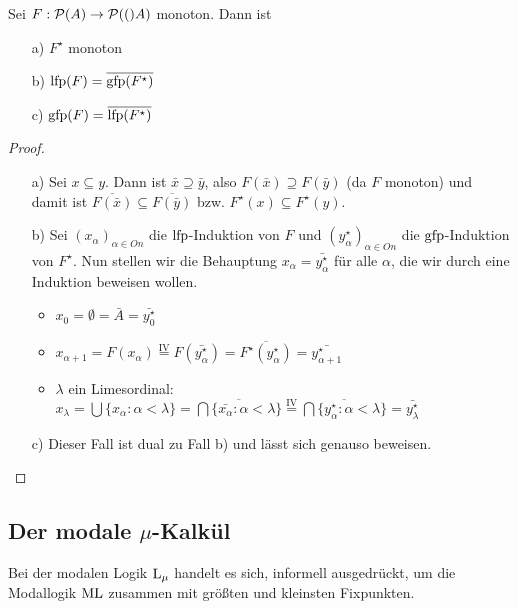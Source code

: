 \begin{satz}
	Sei $F:\mathcal{P}(A)\to\mathcal{P}(()A)$ monoton. Dann ist
	\begin{itemize}
		\item[a)] $F^\star$ monoton
		\item[b)] $\operatorname{lfp}(F)=\overline{\operatorname{gfp}(F^\star)}$
		\item[c)] $\operatorname{gfp}(F)=\overline{\operatorname{lfp}(F^\star)}$
	\end{itemize}
\end{satz}
\begin{proof}
	\begin{itemize}
		\item[a)] Sei $x\subseteq y$. Dann ist $\bar{x}\supseteq\bar{y}$, also $F(\bar{x})\supseteq F(\bar{y})$ (da $F$ monoton) und damit ist $\overline{F(\bar{x})}\subseteq\overline{F(\bar{y})}$ bzw. $F^\star(x)\subseteq F^\star(y)$.
		
		\item[b)] Sei $(x_\alpha)_{\alpha\in On}$ die $\operatorname{lfp}$-Induktion von $F$ und $(y^\star_\alpha)_{\alpha\in On}$ die $\operatorname{gfp}$-Induktion von $F^\star$. Nun stellen wir die Behauptung $x_\alpha=\bar{y^\star_\alpha}$ für alle $\alpha$, die wir durch eine Induktion beweisen wollen.
		\begin{itemize}
			\item $x_0=\emptyset=\bar{A}=\bar{y^\star_0}$
			\item $x_{\alpha+1}=F(x_\alpha) \overset{\text{IV}}{=} F(\bar{y^\star_\alpha})= \overline{F^\star(y^\star_\alpha)} = \bar{y^\star_{\alpha+1}}$
			\item $\lambda$ ein Limesordinal: $x_\lambda=\bigcup\{x_\alpha:\alpha<\lambda\} = \overline{\bigcap \{\bar{x_\alpha} : \alpha < \lambda\}} \overset{\text{IV}}{=} \overline{\bigcap\{y^\star_\alpha : \alpha<\lambda\}}= \bar{y^\star_\lambda}$
		\end{itemize}
		
		\item[c)] Dieser Fall ist dual zu Fall b) und lässt sich genauso beweisen.
	\end{itemize}
\end{proof}


\subsection{Der modale $\mu$-Kalkül}

Bei der modalen Logik $\operatorname{L}_\mu$ handelt es sich, informell ausgedrückt, um die Modallogik $\operatorname{ML}$ zusammen mit größten und kleinsten Fixpunkten.


